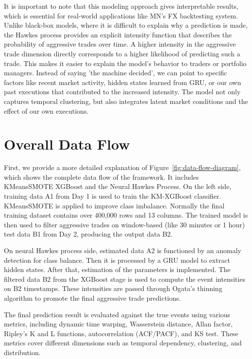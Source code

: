 It is important to note that this modeling approach gives interpretable results, which is essential for real-world applications like MN's FX backtesting system. Unlike black-box models, where it is difficult to explain why a prediction is made, the Hawkes process provides an explicit intensity function that describes the probability of aggressive trades over time. A higher intensity in the aggressive trade dimension directly corresponds to a higher likelihood of predicting such a trade. This makes it easier to explain the model's behavior to traders or portfolio managers. Instead of saying 'the machine decided', we can point to specific factors like recent market activity, hidden states learned from GRU, or our own past executions that contributed to the increased intensity. The model not only captures temporal clustering, but also integrates latent market conditions and the effect of our own executions.


\section{Overall Data Flow} \label{sec:data-flow}
First, we provide a more detailed explanation of Figure~\ref{fig:data-flow-diagram}, which shows the complete data flow of the framework. It includes KMeansSMOTE XGBoost and the Neural Hawkes Process. On the left side, training data A1 from Day 1 is used to train the KM-XGBoost classifier. KMeansSMOTE is applied to improve class imbalance. Normally the final training dataset contains  over 400,000 rows and 13 columns. The trained model is then used to filter aggressive trades on window-based (like 30 minutes or 1 hour) test data B1 from Day 2, producing the output data B2.

On neural Hawkes process side, estimated data A2 is functioned by an anomaly detection for class balance. Then it is processed by a GRU model to extract hidden states. After that, estimation of the parameters is implemented. The filtered data B2 from the XGBoost stage is used to compute the event intensities on B2 timestamps. These intensities are passed through Ogata's thinning algorithm to promote the final aggressive trade predictions.

The final prediction result is evaluated against the true events using various metrics, including dynamic time warping, Wasserstein distance, Allan factor, Ripley's K and L functions, autocorrelation (ACF/PACF), and KS test. These metrics cover different dimensions such as temporal dependency, clustering, and distribution.

